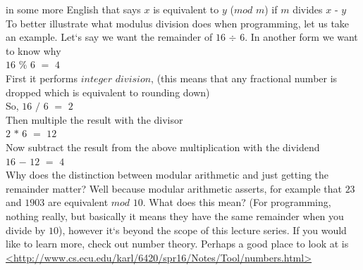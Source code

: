 \documentclass[11]{article}
\begin{document}
in some more English that says $x$ is equivalent to $y$ ($mod$ $m$) if $m$ divides $x$ - $y$\\
To better illustrate what modulus division does when programming, let us take an example. Let`s say we want the remainder of $16$ $\div$ $6$. In another form we want to know why \\
$16$ $\%$ $6$ $=$ $4$\\
First it performs $integer$ $division$, (this means that any fractional number is dropped which is equivalent to rounding down)\\
So, $16$ $/$ $6$ $=$ $2$\\
Then multiple the result with the divisor\\
$2$ $*$ $6$ $=$ $12$\\
Now subtract the result from the above multiplication with the dividend\\
$16$ $-$ $12$ $=$ $4$\\

Why does the distinction between modular arithmetic and just getting the remainder matter? Well because modular arithmetic asserts, for example that $23$ and $1903$ are equivalent $mod$ $10$. What does this mean? (For programming, nothing really, but basically it means they have the same remainder when you divide by $10$), however it`s beyond the scope of this lecture series. If you would like to learn more, check out number theory. Perhaps a good place to look at is \url{<http://www.cs.ecu.edu/karl/6420/spr16/Notes/Tool/numbers.html>}
\end{document}
